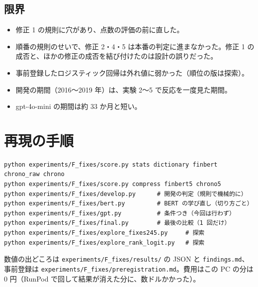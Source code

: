 \documentclass[xelatex,ja=standard,jafont=haranoaji,a4paper,10pt,openany]{bxjsreport}
\newcommand{\code}[1]{\texttt{#1}}
\begin{document}
\section{限界}

\begin{itemize}
\item 修正 1 の規則に穴があり、点数の評価の前に直した。
\item 順番の規則のせいで、修正 2・4・5 は本番の判定に進まなかった。修正 1 の成否と、ほかの修正の成否を結び付けたのは設計の誤りだった。
\item 事前登録したロジスティック回帰は外れ値に弱かった（順位の版は探索）。
\item 開発の期間（2016〜2019 年）は、実験 2〜5 で反応を一度見た期間。
\item gpt-4o-mini の期間は約 33 か月と短い。
\end{itemize}

\chapter*{再現の手順}

\begin{verbatim}
python experiments/F_fixes/score.py stats dictionary finbert chrono_raw chrono
python experiments/F_fixes/score.py compress finbert5 chrono5
python experiments/F_fixes/develop.py      # 開発の判定（規則で機械的に）
python experiments/F_fixes/bert.py         # BERT の学び直し（切り方ごと）
python experiments/F_fixes/gpt.py          # 条件つき（今回は行わず）
python experiments/F_fixes/final.py        # 最後の比較（1 回だけ）
python experiments/F_fixes/explore_fixes245.py     # 探索
python experiments/F_fixes/explore_rank_logit.py   # 探索
\end{verbatim}

数値の出どころは \code{experiments/F\_fixes/results/} の JSON と \code{findings.md}、事前登録は \code{experiments/F\_fixes/preregistration.md}。費用はこの PC の分は 0 円（RunPod で回して結果が消えた分に、数ドルかかった）。
\end{document}
